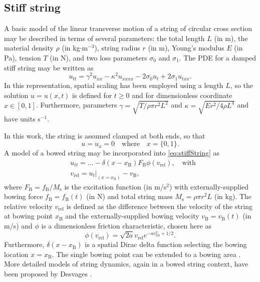 \subsection{Stiff string}\label{subsec:stiffStringPDE}
A basic model of the linear transverse motion of a string of circular cross section may be described in terms of several parameters: the total length $L$ (in m), the material density $\rho$ (in kg$\cdot$m$^{-3}$), string radius $r$ (in m), Young's modulus $E$ (in Pa), tension $T$ (in N), and two loss parameters $\sigma_{0}$ and $\sigma_{1}$. %
The PDE for a damped stiff string may be written as
    \cite{Bilbao2009:NumericalSoundSynthesis} 
\begin{equation}\label{eq:stiffString}
    u_{tt} = \gamma^2 u_{xx}-\kappa^2u_{xxxx} - 2\sigma_0u_{t} + 2\sigma_1u_{txx}.
\end{equation}
In this representation, spatial scaling has been employed using a length $L$, so the solution $u = u(x,t)$ is defined for $t\geq 0$ and for dimensionless coordinate $x\in[0,1]$. Furthermore, parameters $\gamma = \sqrt{T/\rho\pi r^2 L^2}$ and $\kappa = \sqrt{Er^2/4\rho L^4}$ and have units s$^{-1}$.%

In this work, the string is assumed clamped at both ends, so that
\begin{equation}\label{boundary}
    u = u_x = 0 \quad \text{where} \quad x = \{0, 1\}.
\end{equation}
A model of a bowed string \cite{Bilbao2009:NumericalSoundSynthesis} may be incorporated into \eqref{eq:stiffString} as  
\begin{subequations}
\begin{align}
    \label{eq:bowedString} &u_{tt} = \hdots - \delta(x-x_\text{B})F_\text{B}\phi(v_\text{rel}), \quad \text{with} \\
    &v_\text{rel} = u_t |_{(x = x_\text{B})} - v_\text{B},\label{eq:relVelocity}
\end{align}
\end{subequations}
where $F_\text{B} = f_\text{B}/ M_\text{s}$ is the excitation function (in m/s$^2$) with externally-supplied bowing force $f_\text{B} = f_\text{B}(t)$ (in N) and total string mass $M_\text{s} = \rho\pi r^2 L$ (in kg). The relative velocity $v_\text{rel}$ is defined as the difference between the velocity of the string at bowing point $x_\text{B}$ and the externally-supplied bowing velocity $v_\text{B} = v_\text{B}(t)$ (in m/s) and $\phi$ is a dimensionless friction characteristic, chosen here as \cite{Bilbao2009:NumericalSoundSynthesis}
\begin{equation}
    \phi(v_\text{rel}) = \sqrt{2a}v_\text{rel} e^{-av_\text{rel}^2+1/2}.
\end{equation}
Furthermore, $\delta(x-x_\text{B})$ is a spatial Dirac delta function selecting the bowing location $x=x_\text{B}$. The single bowing point can be extended to a bowing area \cite{Bilbao2009:NumericalSoundSynthesis}. More detailed models of string dynamics, again in a bowed string context, have been proposed by Desvages \cite{Desvages16}. 

